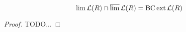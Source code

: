

%
%




\begin{lemma}
\[ \lim \Lang(R) \cap \dlim \Lang(R) = \BC \ext \Lang(R) \]
\begin{proof} TODO...
\end{proof}
\end{lemma}



